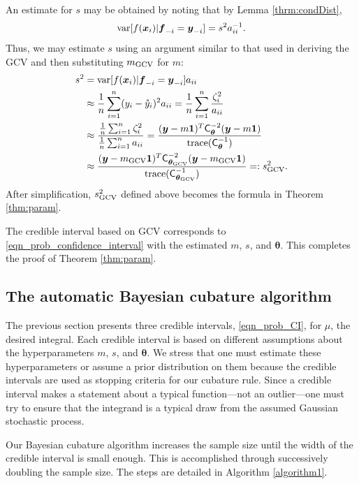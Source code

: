 \documentclass[twocolumn]{svjour3}          %
\newcommand{\bm}[1]{\boldsymbol{#1}}
\newcommand{\trace}[1]{\textup{trace}{#1}}
\newcommand{\vtheta}{{\bm{\theta}}}
\newcommand{\vf}{\bm{f}}
\newcommand{\vx}{\bm{x}}
\newcommand{\vy}{\bm{y}}
\newcommand{\vone}{\bm{1}}
\newcommand{\mC}{\mathsf{C}}
\newcommand{\var}{{\textup{var}}}
\newcommand{\GCV}{\textup{GCV}}
\begin{document}
An estimate for $s$ may be obtained by noting that by Lemma \ref{thrm:condDist},
\begin{align*}
\var[f(\vx_i ) | \vf_{-i} = \vy_{-i}] = s^2 a_{ii}^{-1}.
\end{align*}
Thus, we may estimate $s$ using an argument similar to that used in deriving the GCV and then substituting $m_{\textup{GCV}}$ for $m$:
\begin{align*}
s^2 &= \var[f(\vx_i ) | \vf_{-i} = \vy_{-i}] a_{ii} \\ 
& \approx \frac 1n \sum_{i=1}^n (y_i - \mathring{y}_i)^2a_{ii}
 = \frac 1n \sum_{i=1}^n \frac{\zeta_i^2}{a_{ii}} \\ 
 & \approx \frac{ \frac 1n \sum_{i=1}^n \zeta_i^2}{\frac 1n \sum_{i=1}^n a_{ii} } = \frac{(\vy - m\vone)^T \mC_\vtheta^{-2} (\vy - m \vone)}{ \trace(\mC_\vtheta^{-1}) } \\ 
 & \approx  \frac{(\vy - m_\GCV\vone)^T \mC_{\vtheta_\GCV}^{-2} (\vy - m_\GCV \vone)}{ \trace(\mC_{\vtheta_\GCV}^{-1}) } =: s^2_{\textup{GCV}}.
\end{align*}
After simplification, $s^2_{\textup{GCV}}$ defined above becomes the formula in Theorem \ref{thm:param}.

The credible interval based on GCV corresponds to \eqref{eqn_prob_confidence_interval} with the estimated $m$, $s$, and $\vtheta$.  This completes the proof of Theorem \ref{thm:param}.


\subsection{The automatic Bayesian cubature algorithm}
\label{sec:bayes_cubature_algo}
The previous section presents three credible intervals, \eqref{eqn_prob_CI}, for $\mu$, the desired integral.  Each credible interval is based on different assumptions about the hyperparameters $m$, $s$, and $\vtheta$.  We stress that one must estimate these hyperparameters or assume a prior distribution on them because the credible intervals are used as stopping criteria for our cubature rule.  Since a credible interval makes a statement about a typical function---not an outlier---one must try to ensure that the integrand is a typical draw from the assumed Gaussian stochastic process.

Our  Bayesian cubature algorithm increases the sample size until the width of the credible interval is small enough.  This is accomplished through successively doubling the sample size.  The steps are detailed in Algorithm \ref{algorithm1}.
\end{document}
